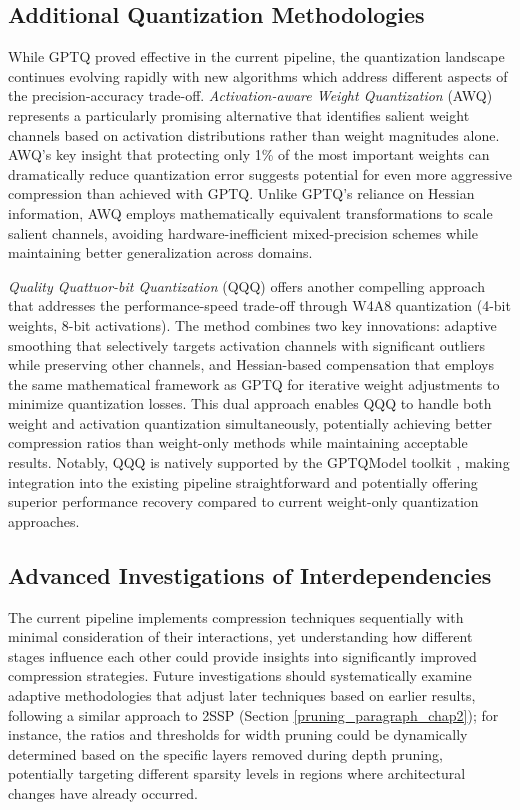 \subsection{Additional Quantization Methodologies}

While GPTQ proved effective in the current pipeline, the quantization landscape continues evolving rapidly with new algorithms which address different aspects of the precision-accuracy trade-off. \textit{Activation-aware Weight Quantization} (AWQ) \cite{awq} represents a particularly promising alternative that identifies salient weight channels based on activation distributions rather than weight magnitudes alone. AWQ's key insight that protecting only 1\% of the most important weights can dramatically reduce quantization error suggests potential for even more aggressive compression than achieved with GPTQ. Unlike GPTQ's reliance on Hessian information, AWQ employs mathematically equivalent transformations to scale salient channels, avoiding hardware-inefficient mixed-precision schemes while maintaining better generalization across domains.

\textit{Quality Quattuor-bit Quantization} (QQQ) \cite{qqq} offers another compelling approach that addresses the performance-speed trade-off through W4A8 quantization (4-bit weights, 8-bit activations). The method combines two key innovations: adaptive smoothing that selectively targets activation channels with significant outliers while preserving other channels, and Hessian-based compensation that employs the same mathematical framework as GPTQ for iterative weight adjustments to minimize quantization losses. This dual approach enables QQQ to handle both weight and activation quantization simultaneously, potentially achieving better compression ratios than weight-only methods while maintaining acceptable results. Notably, QQQ is natively supported by the GPTQModel toolkit \cite{gptqmodel}, making integration into the existing pipeline straightforward and potentially offering superior performance recovery compared to current weight-only quantization approaches.

\subsection{Advanced Investigations of Interdependencies} \label{advanced_interdep}

The current pipeline implements compression techniques sequentially with minimal consideration of their interactions, yet understanding how different stages influence each other could provide insights into significantly improved compression strategies. Future investigations should systematically examine adaptive methodologies that adjust later techniques based on earlier results, following a similar approach to 2SSP \cite{2ssp} (Section \ref{pruning_paragraph_chap2}); for instance, the ratios and thresholds for width pruning could be dynamically determined based on the specific layers removed during depth pruning, potentially targeting different sparsity levels in regions where architectural changes have already occurred.

